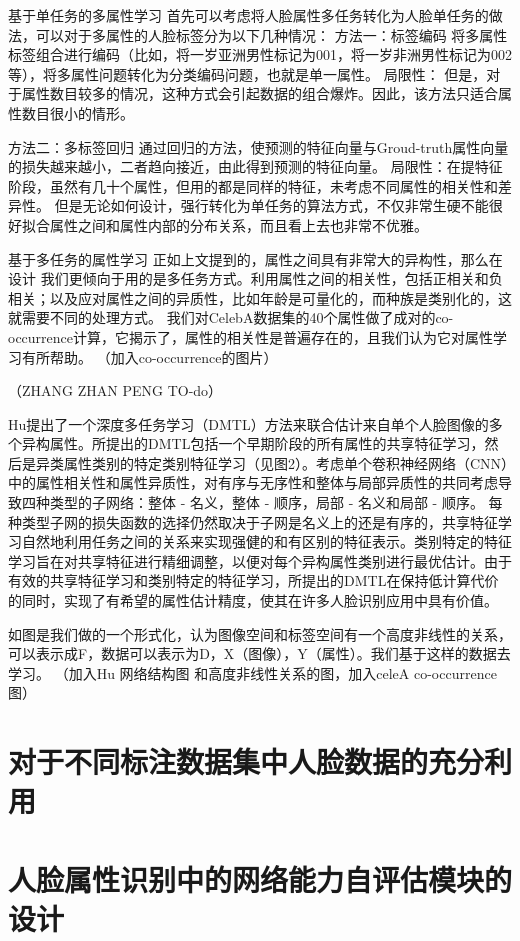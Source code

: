 基于单任务的多属性学习
首先可以考虑将人脸属性多任务转化为人脸单任务的做法，可以对于多属性的人脸标签分为以下几种情况：
方法一：标签编码
将多属性标签组合进行编码（比如，将一岁亚洲男性标记为001，将一岁非洲男性标记为002等），将多属性问题转化为分类编码问题，也就是单一属性。
局限性：
但是，对于属性数目较多的情况，这种方式会引起数据的组合爆炸。因此，该方法只适合属性数目很小的情形。

方法二：多标签回归
通过回归的方法，使预测的特征向量与Groud-truth属性向量的损失越来越小，二者趋向接近，由此得到预测的特征向量。
局限性：在提特征阶段，虽然有几十个属性，但用的都是同样的特征，未考虑不同属性的相关性和差异性。
但是无论如何设计，强行转化为单任务的算法方式，不仅非常生硬不能很好拟合属性之间和属性内部的分布关系，而且看上去也非常不优雅。

基于多任务的属性学习
正如上文提到的，属性之间具有非常大的异构性，那么在设计
我们更倾向于用的是多任务方式。利用属性之间的相关性，包括正相关和负相关；以及应对属性之间的异质性，比如年龄是可量化的，而种族是类别化的，这就需要不同的处理方式。
我们对CelebA数据集的40个属性做了成对的co-occurrence计算，它揭示了，属性的相关性是普遍存在的，且我们认为它对属性学习有所帮助。
（加入co-occurrence的图片）

（ZHANG ZHAN PENG  TO-do）



Hu提出了一个深度多任务学习（DMTL）方法来联合估计来自单个人脸图像的多个异构属性。所提出的DMTL包括一个早期阶段的所有属性的共享特征学习，然后是异类属性类别的特定类别特征学习（见图2）。考虑单个卷积神经网络（CNN）中的属性相关性和属性异质性，对有序与无序性和整体与局部异质性的共同考虑导致四种类型的子网络：整体 - 名义，整体 - 顺序，局部 - 名义和局部 - 顺序。 每种类型子网的损失函数的选择仍然取决于子网是名义上的还是有序的，共享特征学习自然地利用任务之间的关系来实现强健的和有区别的特征表示。类别特定的特征学习旨在对共享特征进行精细调整，以便对每个异构属性类别进行最优估计。由于有效的共享特征学习和类别特定的特征学习，所提出的DMTL在保持低计算代价的同时，实现了有希望的属性估计精度，使其在许多人脸识别应用中具有价值。



如图是我们做的一个形式化，认为图像空间和标签空间有一个高度非线性的关系，可以表示成F，数据可以表示为D，X（图像），Y（属性）。我们基于这样的数据去学习。
（加入Hu 网络结构图 和高度非线性关系的图，加入celeA co-occurrence图）

\section{对于不同标注数据集中人脸数据的充分利用}

\section{人脸属性识别中的网络能力自评估模块的设计}

